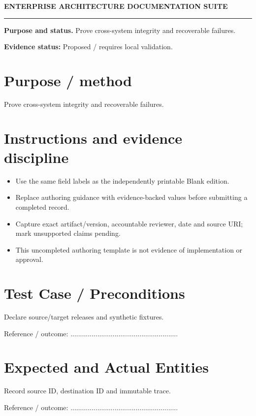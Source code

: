 \documentclass[10pt,letterpaper]{article}
\begin{document}
\begin{center}
{\large\bfseries\color{teal} ENTERPRISE ARCHITECTURE DOCUMENTATION SUITE}\par
{}\par
{}\par
\end{center}
\vspace{8pt}\hrule\vspace{12pt}
\textbf{Purpose and status.} Prove cross-system integrity and recoverable failures.\par
\textbf{Evidence status:} Proposed / requires local validation.\par
\section{Purpose / method}
Prove cross-system integrity and recoverable failures.\par
\section{Instructions and evidence discipline}
\begin{itemize}
\item Use the same field labels as the independently printable Blank edition.
\item Replace authoring guidance with evidence-backed values before submitting a completed record.
\item Capture exact artifact/version, accountable reviewer, date and source URI; mark unsupported claims pending.
\item This uncompleted authoring template is not evidence of implementation or approval.
\end{itemize}
\section{Test Case / Preconditions}
Declare source/target releases and synthetic fixtures.\par
Reference / outcome: ........................................................\par
\section{Expected and Actual Entities}
Record source ID, destination ID and immutable trace.\par
Reference / outcome: ........................................................\par
\end{document}
